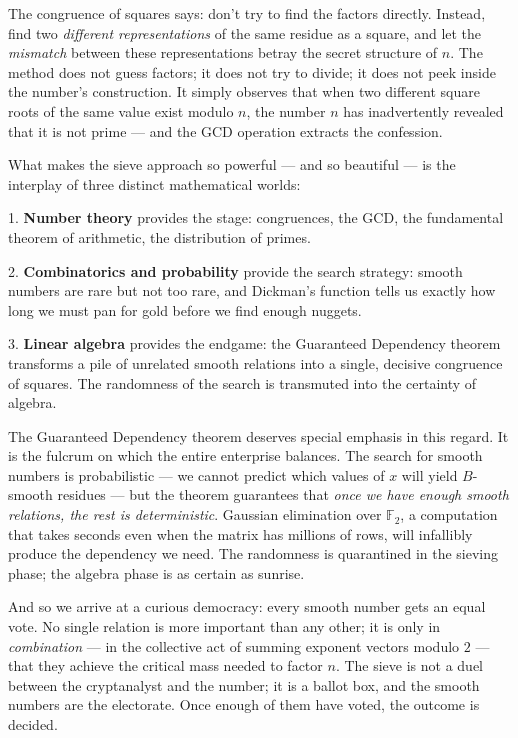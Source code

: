 \documentclass[11pt,openright,twoside]{book}
\theoremstyle{definition}
\begin{document}
The congruence of squares says: don't try to find the factors directly. Instead, find two \textit{different representations} of the same residue as a square, and let the \textit{mismatch} between these representations betray the secret structure of $n$. The method does not guess factors; it does not try to divide; it does not peek inside the number's construction. It simply observes that when two different square roots of the same value exist modulo $n$, the number $n$ has inadvertently revealed that it is not prime --- and the GCD operation extracts the confession.

What makes the sieve approach so powerful --- and so beautiful --- is the interplay of three distinct mathematical worlds:

1. \textbf{Number theory} provides the stage: congruences, the GCD, the fundamental theorem of arithmetic, the distribution of primes.

2. \textbf{Combinatorics and probability} provide the search strategy: smooth numbers are rare but not too rare, and Dickman's function tells us exactly how long we must pan for gold before we find enough nuggets.

3. \textbf{Linear algebra} provides the endgame: the Guaranteed Dependency theorem transforms a pile of unrelated smooth relations into a single, decisive congruence of squares. The randomness of the search is transmuted into the certainty of algebra.

The Guaranteed Dependency theorem deserves special emphasis in this regard. It is the fulcrum on which the entire enterprise balances. The search for smooth numbers is probabilistic --- we cannot predict which values of $x$ will yield $B$-smooth residues --- but the theorem guarantees that \textit{once we have enough smooth relations, the rest is deterministic}. Gaussian elimination over $\mathbb{F}_2$, a computation that takes seconds even when the matrix has millions of rows, will infallibly produce the dependency we need. The randomness is quarantined in the sieving phase; the algebra phase is as certain as sunrise.

And so we arrive at a curious democracy: every smooth number gets an equal vote. No single relation is more important than any other; it is only in \textit{combination} --- in the collective act of summing exponent vectors modulo $2$ --- that they achieve the critical mass needed to factor $n$. The sieve is not a duel between the cryptanalyst and the number; it is a ballot box, and the smooth numbers are the electorate. Once enough of them have voted, the outcome is decided.
\end{document}
